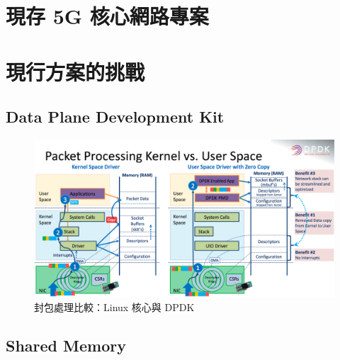 \section{現存 5G 核心網路專案}
\label{sec:5g_core_project}

\section{現行方案的挑戰}
\label{sec:challenge}




\subsection{Data Plane Development Kit}
\label{subsec:DPDK}

\begin{figure}[htb]
    \centering
    \includegraphics[height=!,width=0.6\linewidth,keepaspectratio=true]
                    {figures/dpdk_vs_kernel}
                    \caption[封包處理比較：Linux 核心與 DPDK]{{\footnotesize 封包處理比較：Linux 核心與 DPDK \cite{dpdk}}}
                    \label{fig:dpdk_vs_kernel}
\end{figure}

\subsection{Shared Memory}
\label{subsec:shared_memory}
